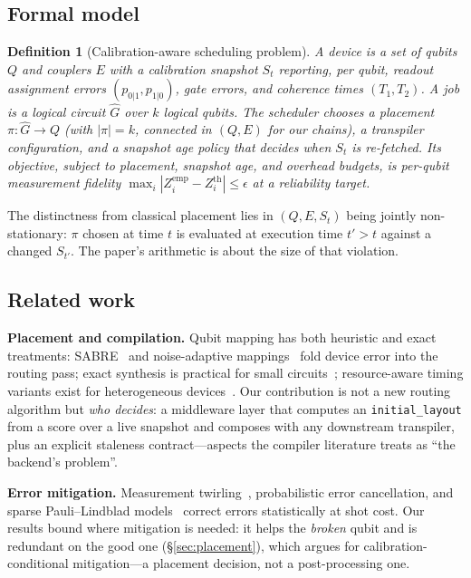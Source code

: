 \documentclass[journal,10pt,twocolumn]{IEEEtran}
\newtheorem{definition}{Definition}
\begin{document}
\subsection{Formal model}
\begin{definition}[Calibration-aware scheduling problem]
A device is a set of qubits $Q$ and couplers $E$ with a calibration snapshot $S_t$ reporting, per qubit, readout
assignment errors $(p_{0|1},p_{1|0})$, gate errors, and coherence times $(T_1,T_2)$. A job is a logical circuit
$\hat{G}$ over $k$ logical qubits. The scheduler chooses a \emph{placement} $\pi:\hat{G}\to Q$ (with
$|\pi|=k$, connected in $(Q,E)$ for our chains), a transpiler configuration, and a \emph{snapshot age policy}
that decides when $S_t$ is re-fetched. Its objective, subject to placement, snapshot age, and overhead budgets, is
per-qubit measurement fidelity $\max_i|Z_i^{\mathrm{emp}}\!\!-\!Z_i^{\mathrm{th}}|\!\le\!\epsilon$ at a
reliability target.
\end{definition}
The distinctness from classical placement lies in $(Q,E,S_t)$ being jointly non-stationary: $\pi$ chosen at time $t$
is evaluated at execution time $t'>t$ against a changed $S_{t'}$. The paper's arithmetic is about the size of that
violation.

\subsection{Related work}
\textbf{Placement and compilation.} Qubit mapping has both heuristic and exact treatments: SABRE~\cite{li2019sabre}
and noise-adaptive mappings~\cite{murali2019noise} fold device error into the routing pass; exact synthesis is
practical for small circuits~\cite{tan2020iccado}; resource-aware timing variants exist for heterogeneous
devices~\cite{lao2022timing}. Our contribution is not a new routing algorithm but \emph{who decides}: a middleware
layer that computes an \texttt{initial\_layout} from a score over a live snapshot and composes with any downstream
transpiler, plus an explicit staleness contract---aspects the compiler literature treats as ``the backend's
problem''.

\textbf{Error mitigation.} Measurement twirling~\cite{nation2023,bravyi2021meas}, probabilistic error cancellation,
and sparse Pauli--Lindblad models~\cite{vanberg2023,temme2017} correct errors statistically at shot cost. Our results
bound where mitigation is needed: it helps the \emph{broken} qubit and is redundant on the good one
(\S\ref{sec:placement}), which argues for calibration-conditional mitigation---a placement decision, not a
post-processing one.
\end{document}
